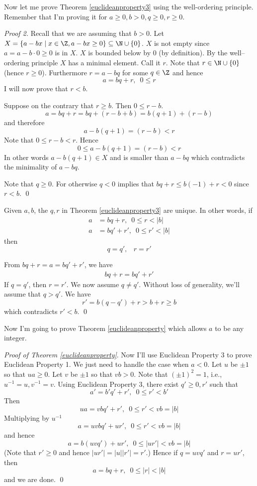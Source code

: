Now let me prove Theorem \ref{euclideanproperty3} using
the well-ordering principle.
Remember that I'm proving it for $a \geq 0, b > 0, q \geq 0, r \geq 0$.

\textit{Proof 2.}
Recall that we are assuming that $b > 0$.
Let $X = \{ a - bx \mid x \in \Z, a - bx \geq 0 \} \subseteq \N \cup \{0\}$.
$X$ is not empty since $a = a - b \cdot 0 \geq 0$ is in $X$.
$X$ is bounded below by $0$ (by definition).
By the well--ordering principle $X$ has a minimal element.
Call it $r$. Note that $r \in \N \cup \{0\}$ (hence $r \geq 0$).
Furthermore $r = a - bq$ for some $q \in \Z$ and hence
\[
a = bq + r, \,\,\, 0 \leq r
\]
I will now prove that $r < b$.

Suppose on the contrary that $r \geq b$.
Then $0 \leq r - b$.
\[
a = bq + r = bq + (r - b + b)
= b(q + 1) + (r - b)
\]
and therefore
\[
a - b(q + 1) = (r - b) < r
\]
Note that $0 \leq r - b < r$.
Hence
\[
0 \leq a - b(q + 1) = (r - b) < r
\]
In other words
$a - b(q + 1) \in X$
and is smaller than $a - bq$ which
contradicts the minimality of $a - bq$.

Note that $q \geq 0$.
For otherwise $q < 0$ implies that
$bq + r \leq b(-1) + r < 0$ since $r < b$.
\qed




\begin{prop}
  Given $a,b$, the $q,r$ in
  Theorem \ref{euclideanproperty3}
  are unique.
  In other words,
  if
  \begin{align*}
    a &= bq+r, \,\,\, 0 \leq r < |b| \\
    a &= bq'+r', \,\,\, 0 \leq r' < |b|
  \end{align*}
  then
  \[
  q=q', \,\,\,\,\, r=r'
  \]
\end{prop}

\proof
From $bq + r = a = bq' + r'$, we have
\begin{align*}
           bq + r = bq' + r'
\end{align*}
If $q = q'$, then $r = r'$.
We now assume $q \neq q'$.
Without loss of generality, we'll assume that $q > q'$.
We have
\[
r' = b(q - q') + r > b + r \geq b
\]
which contradicts $r' < b$.
\qed

Now I'm going to prove Theorem \ref{euclideanproperty}
which allows $a$ to be any integer.

\textit{Proof of Theorem \ref{euclideanproperty}}.
Now I'll use Euclidean Property 3 to prove Euclidean Property 1.
We just need to handle the case when $a < 0$.
Let $u$ be $\pm 1$ so that $ua \geq 0$.
Let $v$ be $\pm 1$ so that $vb > 0$.
Note that $(\pm 1)^2 = 1$, i.e., $u^{-1} = u, v^{-1} = v$.
Using Euclidean Property 3, there exist $q' \geq 0, r'$ such that
\[
a' = b'q' + r', \,\,\, 0 \leq r' < b'
\]
Then
\[
ua = vbq' + r', \,\,\, 0 \leq r' < vb = |b|
\]
Multiplying by $u^{-1}$
\[
a = uvbq' + ur', \,\,\, 0 \leq r' < vb = |b|
\]
and hence
\[
a = b(uvq') + ur', \,\,\, 0 \leq |ur'| < vb = |b|
\]
(Note that $r' \geq 0$ and hence $|ur'| = |u||r'| = r'$.)
Hence if $q = uvq'$ and $r = ur'$, then
\[
a = bq + r, \,\,\, 0 \leq |r| < |b|
\]
and we are done.
\qed









